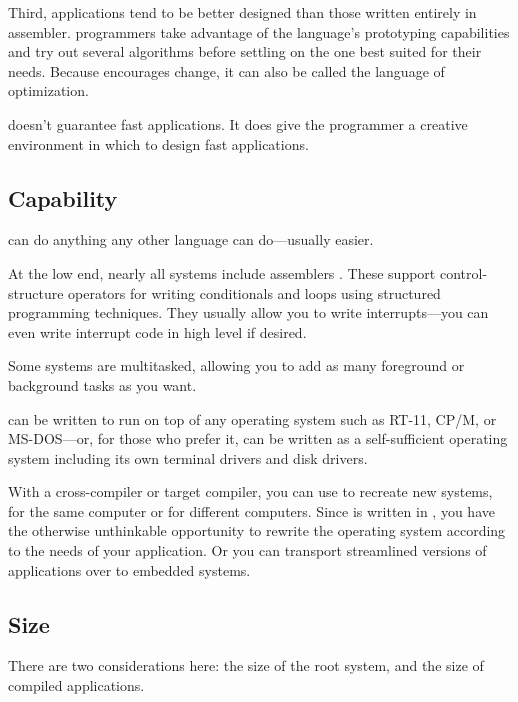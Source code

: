 
Third, \Forth{} applications tend to be better designed than those
written entirely in assembler. \Forth{} programmers take advantage of the
language's prototyping capabilities and try out several algorithms
before settling on the one best suited for their needs. Because \Forth{}
encourages change, it can also be called the language of optimization.

\Forth{} doesn't guarantee fast applications. It does give the programmer
a creative environment in which to design fast applications.%
%

\subsection{Capability}
\Forth{}
can do anything any other language can do---usually easier.%

At the low end, nearly all \Forth{} systems include assemblers%
. These
support control-structure operators for writing conditionals and loops
using structured programming techniques. They usually allow you to
write interrupts---you can even write interrupt code in high level if
desired.

Some \Forth{} systems are multitasked, allowing you to add as many
foreground or background tasks as you want.

\Forth{} can be written to run on top of any operating system such as
RT-11, CP/M, or MS-DOS---or, for those who prefer it, \Forth{} can be
written as a self-sufficient operating system including its own
terminal drivers and disk drivers.

With a \Forth{} cross-compiler%
 or
target compiler,%
%
you can use \Forth{} to recreate new \Forth{} systems, for the same computer
or for different computers. Since \Forth{} is written in \Forth{}, you have
the otherwise unthinkable opportunity to rewrite the operating system
according to the needs of your application. Or you can transport
streamlined versions of applications over to embedded systems. 


\subsection{Size}%
There are two considerations here: the size of the root \Forth{} system,
and the size of compiled \Forth{} applications.

